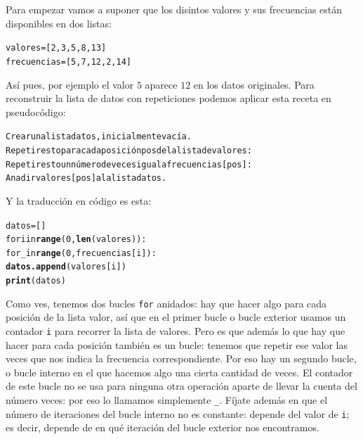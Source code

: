\documentclass[10pt,a4paper]{article}\usepackage[]{graphicx}\usepackage[]{color}
\makeatletter
\newcommand{\hlkwd}[1]{\textcolor[rgb]{0.737,0.353,0.396}{\textbf{#1}}}%
\newenvironment{kframe}{%
 \def\at@end@of@kframe{}%
 \ifinner\ifhmode%
  \def\at@end@of@kframe{\end{minipage}}%
  \begin{minipage}{\columnwidth}%
 \fi\fi%
 \def\FrameCommand##1{\hskip\@totalleftmargin \hskip-\fboxsep
 \colorbox{shadecolor}{##1}\hskip-\fboxsep
     \hskip-\linewidth \hskip-\@totalleftmargin \hskip\columnwidth}%
 \MakeFramed {\advance\hsize-\width
   \@totalleftmargin\z@ \linewidth\hsize
   \@setminipage}}%
 {\par\unskip\endMakeFramed%
 \at@end@of@kframe}
\newenvironment{knitrout}{}{} %
\newcounter {cont01}
\makeatother
\begin{document}
Para empezar vamos a suponer que los disintos valores y sus frecuencias están disponibles en dos listas:
\begin{knitrout}
\color{fgcolor}\begin{kframe}
\begin{alltt}
valores = [2,3,5,8,13]
frecuencias = [5,7,12,2,14]
\end{alltt}
\end{kframe}
\end{knitrout}
Así pues, por ejemplo el valor $5$ aparece $12$ en los datos originales. Para reconstruir la lista de datos con repeticiones podemos aplicar esta receta en pseudocódigo:
\begin{knitrout}
\color{fgcolor}\begin{kframe}
\begin{alltt}
Crear una lista datos, inicialmente vacía.
Repetir esto para cada posición pos de la lista de valores:
  Repetir esto un número de veces igual a frecuencias[pos]:
    Anadir valores[pos] a la lista datos.
\end{alltt}
\end{kframe}
\end{knitrout}
Y la traducción en código es esta:
\begin{knitrout}
\color{fgcolor}\begin{kframe}
\begin{alltt}
datos = []
for i in \hlkwd{range}(0, \hlkwd{len}(valores)):
  for _ in \hlkwd{range}(0, frecuencias[i]):
    \hlkwd{datos.append}(valores[i])
\hlkwd{print}(datos)
\end{alltt}
\end{kframe}
\end{knitrout}
Como ves, tenemos dos bucles {\tt for} anidados: hay que hacer algo para cada posición de la lista valor, así que en el primer bucle o {\sf bucle exterior}  usamos un contador {\tt i} para recorrer la lista de valores. Pero es que además lo que hay que hacer para cada posición también es un bucle: tenemos que repetir ese valor las veces que nos indica la frecuencia correspondiente. Por eso hay un {segundo bucle, o bucle interno} en el que hacemos algo una cierta cantidad de veces. El contador de este bucle no se usa para ninguna otra operación aparte de llevar la cuenta del número veces: por eso lo llamamos simplemente \verb&_&.  Fíjate además en que el número de iteraciones del bucle interno no es constante: depende del valor de {\tt i}; es decir, depende de en qué iteración del bucle exterior nos encontramos.
\end{document}

